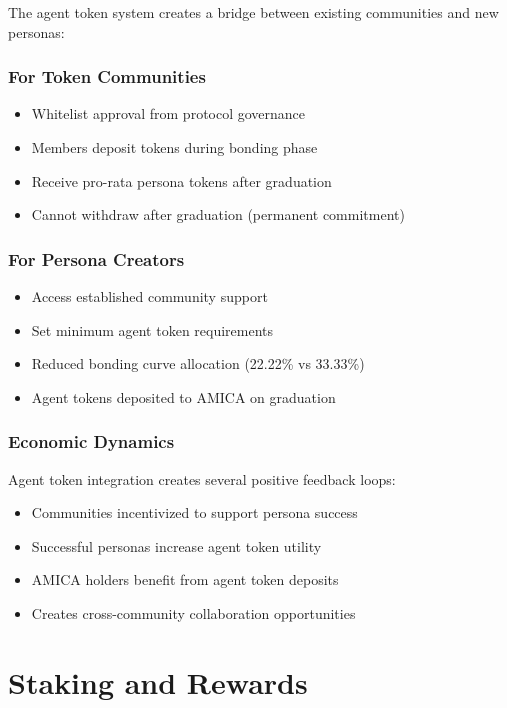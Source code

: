 \documentclass{article}
\begin{document}
The agent token system creates a bridge between existing communities and new personas:

\subsubsection{For Token Communities}
\begin{itemize}
    \item Whitelist approval from protocol governance
    \item Members deposit tokens during bonding phase
    \item Receive pro-rata persona tokens after graduation
    \item Cannot withdraw after graduation (permanent commitment)
\end{itemize}

\subsubsection{For Persona Creators}
\begin{itemize}
    \item Access established community support
    \item Set minimum agent token requirements
    \item Reduced bonding curve allocation (22.22\% vs 33.33\%)
    \item Agent tokens deposited to AMICA on graduation
\end{itemize}

\subsubsection{Economic Dynamics}
Agent token integration creates several positive feedback loops:
\begin{itemize}
    \item Communities incentivized to support persona success
    \item Successful personas increase agent token utility
    \item AMICA holders benefit from agent token deposits
    \item Creates cross-community collaboration opportunities
\end{itemize}

\section{Staking and Rewards}
\end{document}
